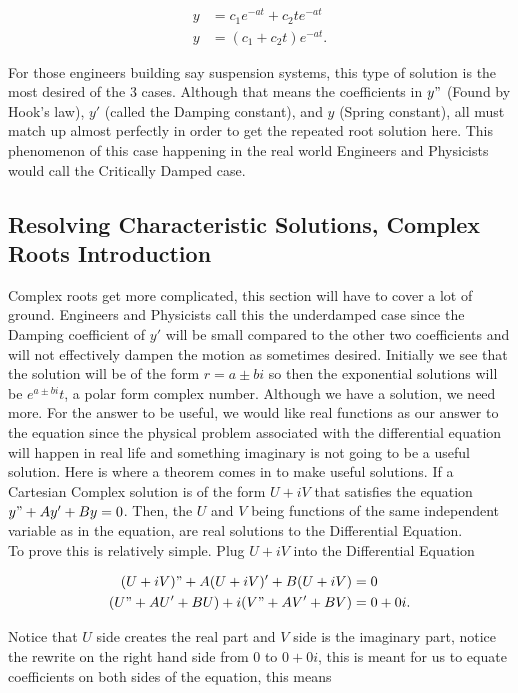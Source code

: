 \documentclass[12pt]{article}
\begin{document}
\begin{align*}
    y &= c_1e^{-at}+c_2te^{-at} \\
    y &= (c_1+c_2t)e^{-at}.
\end{align*}

For those engineers building say suspension systems, this type of solution is the most desired of the 3 cases. Although that means the coefficients in $y"$ (Found by Hook's law), $y'$ (called the Damping constant), and $y$ (Spring constant), all must match up almost perfectly in order to get the repeated root solution here. This phenomenon of this case happening in the real world Engineers and Physicists would call the Critically Damped case.

\subsection{Resolving Characteristic Solutions, Complex Roots Introduction}

Complex roots get more complicated, this section will have to cover a lot of ground. Engineers and Physicists call this the underdamped case since the Damping coefficient of $y'$ will be small compared to the other two coefficients and will not effectively dampen the motion as sometimes desired. Initially we see that the solution will be of the form $r=a \pm bi$ so then the exponential solutions will be $e^{a \pm bi}t$, a polar form complex number. Although we have a solution, we need more. For the answer to be useful, we would like real functions as our answer to the equation since the physical problem associated with the differential equation will happen in real life and something imaginary is not going to be a useful solution. Here is where a theorem comes in to make useful solutions. If a Cartesian Complex solution is of the form $U+iV$ that satisfies the equation $y"+Ay'+By=0$. Then, the $U$ and $V$ being functions of the same independent variable as in the equation, are real solutions to the Differential Equation. \\

To prove this is relatively simple. Plug $U+iV$ into the Differential Equation

\begin{align*}
    (U+iV)"+A(U+iV)'+B(U+iV) &= 0 \\
       (U"+AU'+BU)+i(V"+AV'+BV) &= 0+0i.
\end{align*}

Notice that $U$ side creates the real part and $V$ side is the imaginary part, notice the rewrite on the right hand side from $0$ to $0+0i$, this is meant for us to equate coefficients on both sides of the equation, this means
\end{document}
